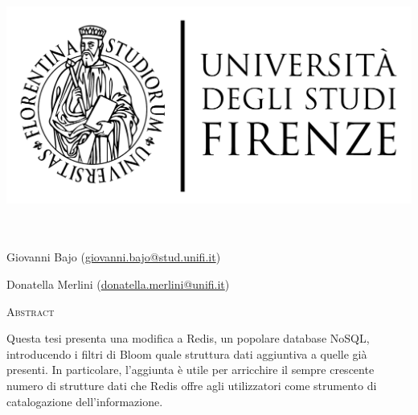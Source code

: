 \documentclass[ oneside,openright,titlepage,numbers=noenddot,%
                headinclude,footinclude,cleardoublepage=empty,
                BCOR=5mm,paper=a4,fontsize=11pt
                ]{scrreprt}
\begin{document}
\frenchspacing
\raggedbottom
{}
\pagestyle{plain}

\setlength{\parindent}{0pt}
\begin{titlepage}
    \begin{addmargin}[-2cm]{-2cm}
    \large
    \hfill
    \vfill

    \begin{center}
	    \begingroup
    	        \includegraphics[scale=0.15]{img/LOGO}\\
    	        \myFaculty \\
    	        \myDegree \\
    	        \vspace{0.5cm}
    	        \vspace{0.5cm}
	    \endgroup
    \end{center}

    \vfill

	\begin{description}[labelwidth=10em,leftmargin=!,font={\normalfont\scshape\color{Maroon}}]
		\item[Tesi] \myTitle
		\item[Studente] Giovanni Bajo (\href{mailto:giovanni.bajo@stud.unifi.it}{giovanni.bajo@stud.unifi.it})
		\item[Relatore] Donatella Merlini (\href{mailto:giovanni.bajo@stud.unifi.it}{donatella.merlini@unifi.it})
    \end{description}

    \vfill

    \textsc{\color{Maroon}Abstract}

    \medskip

    Questa tesi presenta una modifica a Redis, un popolare database NoSQL, introducendo i filtri di
    Bloom quale struttura dati aggiuntiva a quelle già presenti. In particolare, 
    l'aggiunta è utile per arricchire il sempre crescente numero di strutture dati che Redis offre agli
    utilizzatori come strumento di catalogazione dell'informazione.


\end{addmargin}
\end{titlepage}
\end{document}
